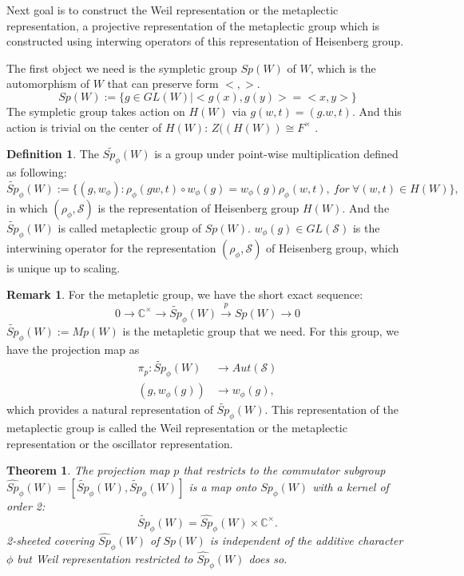 \documentclass[12pt,a4paper,english]{article}
\theoremstyle{plain}
\newtheorem{thm}{Theorem}[section]
\theoremstyle{definition}
\newtheorem{defi}{Definition}
\newtheorem*{rem}{Remark}
\begin{document}
Next goal is to construct the Weil representation or the metaplectic representation, a projective representation of the metaplectic group which is constructed using interwing operators of this representation of Heisenberg group. 

The first object we need is the sympletic group $Sp(W)$ of $W$, which is the automorphism of $W$ that can preserve form $<,>$.
\begin{equation*}
    Sp(W):=\{g\in GL(W)|<g(x),g(y)>=<x,y>\}
\end{equation*}
The sympletic group takes action on $H(W)$ via $g(w,t)=(g.w,t)$. And this action is trivial on the center of $H(W)$: $Z((H(W))\cong F^{\times}$ .

\begin{defi}
The $\widetilde{Sp_{\phi}}(W)$ is a group under point-wise multiplication defined as following: 
\begin{equation*}
    \widetilde{Sp}_{\phi}(W):=\{(g,w_{\phi}):\rho_{\phi}(gw,t)\circ w_{\phi}(g)=w_{\phi}(g)\rho_{\phi}(w,t),\ for\ \forall (w,t )\in H(W)\},
\end{equation*}
in which $(\rho_{\phi}, \mathcal{S})$  is the representation of Heisenberg group $H(W)$. And the $\widetilde{Sp}_{\phi}(W)$ is called metaplectic group of $Sp(W)$.
$w_{\phi}(g)\in GL(\mathcal{S})$ is the interwining operator for the representation $(\rho_{\phi},\mathcal{S})$ of Heisenberg group, which is unique up to scaling.
\end{defi}
\begin{rem}
For the metapletic group, we have the short exact sequence:
\begin{equation*}
  0\rightarrow \mathbb{C}^{\times} \rightarrow \widetilde{Sp}_{\phi}(W)\xrightarrow{p}Sp(W)\rightarrow 0  
\end{equation*}
$\widetilde{Sp}_{\phi}(W):=Mp(W)$ is the metapletic group that we need. For this group, we have the projection map as 
\begin{align*}
     \pi_{p}: \widetilde{Sp}_{\phi}(W)&\rightarrow Aut(\mathcal{S})\\
      (g, w_{\phi}(g))&\rightarrow w_{\phi}(g),
\end{align*}
which provides a natural representation of $\widetilde{Sp}_{\phi}(W)$. This representation of the metaplectic group is called the Weil representation or the metaplectic
representation or the oscillator representation.
\end{rem}
\begin{thm}
The projection map $p$ that restricts to the commutator subgroup $\hat{Sp}_{\phi}(W)=[\widetilde{Sp}_{\phi}(W),\widetilde{Sp}_{\phi}(W)]$ is a map onto $Sp_{\phi}(W)$ with a kernel of order 2:
\begin{equation*}
    \widetilde{Sp}_{\phi}(W)=\hat{Sp}_{\phi}(W)\times \mathbb{C}^{\times}. 
\end{equation*}
2-sheeted covering $\hat{ Sp}_{\phi}(W)$ of $Sp(W)$ is independent of the additive character $\phi$ but Weil representation restricted to $\hat{Sp}_{\phi}(W)$ does so. 
\end{thm}
\end{document}
